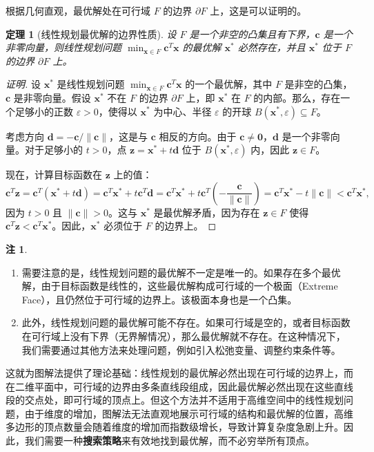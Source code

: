\documentclass[12pt]{article}
\theoremstyle{plain}
\newtheorem{thm}{定理}[subsection]
\theoremstyle{definition}
\newtheorem{rmk}{注}[subsection]
\newenvironment{prf}[1][证明]{\begin{proof}[#1]}{\end{proof}}
\begin{document}
根据几何直观，最优解处在可行域 $F$ 的边界 $\partial F$ 上，这是可以证明的。
\begin{thm}[线性规划最优解的边界性质]
    设 $F$ 是一个非空的凸集且有下界，$\bm{c}$ 是一个非零向量，则线性规划问题 $\displaystyle \min_{\bm{x} \in F} \bm{c}^T \bm{x}$ 的最优解 $\bm{x}^*$ 必然存在，并且 $\bm{x}^*$ 位于 $F$ 的边界 $\partial F$ 上。
\end{thm}
\begin{prf}
    设 $\bm{x}^*$ 是线性规划问题 $\displaystyle \min_{\bm{x} \in F} \bm{c}^T \bm{x}$ 的一个最优解，其中 $F$ 是非空的凸集，$\bm{c}$ 是非零向量。假设 $\bm{x}^*$ 不在 $F$ 的边界 $\partial F$ 上，即 $\bm{x}^*$ 在 $F$ 的内部。那么，存在一个足够小的正数 $\varepsilon > 0$，使得以 $\bm{x}^*$ 为中心、半径 $\varepsilon$ 的开球 $B(\bm{x}^*, \varepsilon) \subseteq F$。

    考虑方向 $\bm{d} = -\bm{c} / \|\bm{c}\|$，这是与 $\bm{c}$ 相反的方向。由于 $\bm{c} \neq \bm{0}$，$\bm{d}$ 是一个非零向量。对于足够小的 $t > 0$，点 $\bm{z} = \bm{x}^* + t \bm{d}$ 位于 $B(\bm{x}^*, \varepsilon)$ 内，因此 $\bm{z} \in F$。

    现在，计算目标函数在 $\bm{z}$ 上的值：
    \[
    \bm{c}^T \bm{z} = \bm{c}^T (\bm{x}^* + t \bm{d}) = \bm{c}^T \bm{x}^* + t \bm{c}^T \bm{d} = \bm{c}^T \bm{x}^* + t \bm{c}^T \left( -\frac{\bm{c}}{\|\bm{c}\|} \right) = \bm{c}^T \bm{x}^* - t \|\bm{c}\| < \bm{c}^T \bm{x}^*,
    \]
    因为 $t > 0$ 且 $\|\bm{c}\| > 0$。这与 $\bm{x}^*$ 是最优解矛盾，因为存在 $\bm{z} \in F$ 使得 $\bm{c}^T \bm{z} < \bm{c}^T \bm{x}^* $。因此，$\bm{x}^*$ 必须位于 $F$ 的边界上。
\end{prf}
\begin{rmk}
    \begin{enumerate}
        \item 需要注意的是，线性规划问题的最优解不一定是唯一的。如果存在多个最优解，由于目标函数是线性的，这些最优解构成可行域的一个极面（Extreme Face），且仍然位于可行域的边界上。该极面本身也是一个凸集。
        \item 此外，线性规划问题的最优解可能不存在。如果可行域是空的，或者目标函数在可行域上没有下界（无界解情况），那么最优解就不存在。在这种情况下，我们需要通过其他方法来处理问题，例如引入松弛变量、调整约束条件等。
    \end{enumerate}
\end{rmk}

这就为图解法提供了理论基础：线性规划的最优解必然出现在可行域的边界上，而在二维平面中，可行域的边界由多条直线段组成，因此最优解必然出现在这些直线段的交点处，即可行域的顶点上。但这个方法并不适用于高维空间中的线性规划问题，由于维度的增加，图解法无法直观地展示可行域的结构和最优解的位置，高维多边形的顶点数量会随着维度的增加而指数级增长，导致计算复杂度急剧上升。因此，我们需要一种\textbf{搜索策略}来有效地找到最优解，而不必穷举所有顶点。
\end{document}
